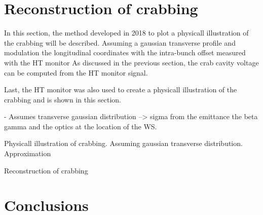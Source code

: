 \section{Reconstruction of crabbing}\label{sec:Crabbing_reconstruction}

In this section, the method developed in 2018 to plot a physicall illustration of the crabbing will be described. %
Assuming a gaussian transverse profile and modulation the longitudinal coordinates with the intra-bunch offset measured with the HT monitor
As discussed in the previous section, the crab cavity voltage can be computed from the HT monitor signal. 

Last, the HT monitor was also used to create a physicall illustration of the crabbing and is shown in this section. 

- Assumes transverse gaussian distribution --> sigma from the emittance the beta gamma and the optics at the location of the WS.


Physicall illustration of crabbing. 
Assuming gaussian transverse distribution. Approximation

Reconstruction of crabbing

\section{Conclusions}


